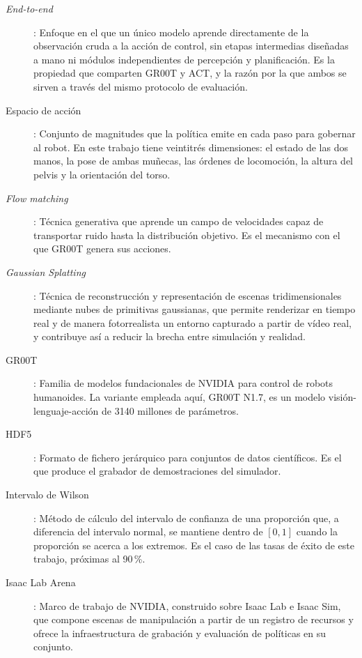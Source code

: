 \begin{description}
	\item[\textit{End-to-end}]: Enfoque en el que un único modelo aprende directamente de la
	observación cruda a la acción de control, sin etapas intermedias diseñadas a mano ni módulos
	independientes de percepción y planificación. Es la propiedad que comparten GR00T y ACT, y la
	razón por la que ambos se sirven a través del mismo protocolo de evaluación.

	\item[Espacio de acción]: Conjunto de magnitudes que la política emite en cada paso para
	gobernar al robot. En este trabajo tiene veintitrés dimensiones: el estado de las dos manos, la
	pose de ambas muñecas, las órdenes de locomoción, la altura del pelvis y la orientación del
	torso.

	\item[\textit{Flow matching}]: Técnica generativa que aprende un campo de velocidades capaz de
	transportar ruido hasta la distribución objetivo. Es el mecanismo con el que GR00T genera sus
	acciones.

	\item[\textit{Gaussian Splatting}]: Técnica de reconstrucción y representación de escenas
	tridimensionales mediante nubes de primitivas gaussianas, que permite renderizar en tiempo
	real y de manera fotorrealista un entorno capturado a partir de vídeo real, y contribuye así a
	reducir la brecha entre simulación y realidad.

	\item[GR00T]: Familia de modelos fundacionales de NVIDIA para control de robots humanoides. La
	variante empleada aquí, GR00T N1.7, es un modelo visión-lenguaje-acción de 3140 millones de
	parámetros.

	\item[HDF5]: Formato de fichero jerárquico para conjuntos de datos científicos. Es el que
	produce el grabador de demostraciones del simulador.

	\item[Intervalo de Wilson]: Método de cálculo del intervalo de confianza de una proporción
	que, a diferencia del intervalo normal, se mantiene dentro de $[0,1]$ cuando la proporción se
	acerca a los extremos. Es el caso de las tasas de éxito de este trabajo, próximas al 90\,\%.

	\item[Isaac Lab Arena]: Marco de trabajo de NVIDIA, construido sobre Isaac Lab e Isaac Sim, que
	compone escenas de manipulación a partir de un registro de recursos y ofrece la infraestructura
	de grabación y evaluación de políticas en su conjunto.


\end{description}
